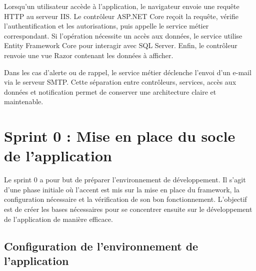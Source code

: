 Lorsqu'un utilisateur accède à l'application, le navigateur envoie une requête HTTP au serveur IIS. Le contrôleur ASP.NET Core reçoit la requête, vérifie l'authentification et les autorisations, puis appelle le service métier correspondant. Si l'opération nécessite un accès aux données, le service utilise Entity Framework Core pour interagir avec SQL Server. Enfin, le contrôleur renvoie une vue Razor contenant les données à afficher.

Dans les cas d'alerte ou de rappel, le service métier déclenche l'envoi d'un e-mail via le serveur SMTP. Cette séparation entre contrôleurs, services, accès aux données et notification permet de conserver une architecture claire et maintenable.



\section{Sprint 0 : Mise en place du socle de l’application}

Le sprint 0 a pour but de préparer l'environnement de développement. Il s'agit d'une phase initiale où l'accent est mis sur la mise en place du framework, la configuration nécessaire et la vérification de son bon fonctionnement. L'objectif est de créer les bases nécessaires pour se concentrer ensuite sur le développement de l'application de manière efficace. \\

\subsection{Configuration de l’environnement de l’application }

